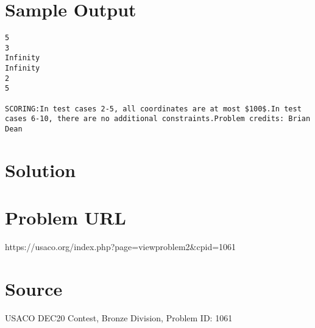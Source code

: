 \documentclass[12pt]{article}
\begin{document}
\section*{Sample Output}
\begin{verbatim}
5
3
Infinity
Infinity
2
5

SCORING:In test cases 2-5, all coordinates are at most $100$.In test cases 6-10, there are no additional constraints.Problem credits: Brian Dean
\end{verbatim}

\section*{Solution}


\section*{Problem URL}
https://usaco.org/index.php?page=viewproblem2&cpid=1061

\section*{Source}
USACO DEC20 Contest, Bronze Division, Problem ID: 1061
\end{document}

